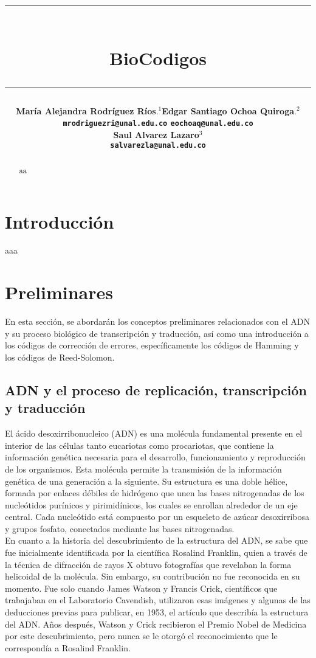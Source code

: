 \documentclass[12pt]{article}
\title{\vspace{-2cm}\par\noindent\rule{16cm}{1pt}\large
\\\bfseries BioCodigos
\vspace{-0.34cm}\par\noindent\hspace{0.15cm}\rule{16cm}{1pt}
\vspace{-0.6cm}
}
\author{\small \bfseries María Alejandra Rodríguez Ríos$.^1$\quad \quad\small Edgar Santiago Ochoa Quiroga$.^{2}$\\ \small \quad \texttt{mrodriguezri@unal.edu.co} \quad \quad \quad \quad \quad \quad \texttt{eochoaq@unal.edu.co}\quad\quad \quad\\ \small \bfseries Saul Alvarez Lazaro$^{3}$\\
\small \texttt{salvarezla@unal.edu.co}
}
\begin{document}
\maketitle
\begin{abstract}
aa
\end{abstract}

\section{Introducción}

aaa



\section{Preliminares}
En esta sección, se abordarán los conceptos preliminares relacionados con el ADN y su proceso biológico de transcripción y traducción, así como una introducción a los códigos de corrección de errores, específicamente los códigos de Hamming y los códigos de Reed-Solomon.
\subsection{ADN y el proceso de replicación, transcripción y traducción}

El ácido desoxirribonucleico (ADN) es una molécula fundamental presente en el interior de las células tanto eucariotas como procariotas, que contiene la información genética necesaria para el desarrollo, funcionamiento y reproducción de los organismos. Esta molécula permite la transmisión de la información genética de una generación a la siguiente. Su estructura es una doble hélice, formada por enlaces débiles de hidrógeno que unen las bases nitrogenadas de los nucleótidos purínicos y pirimidínicos, los cuales se enrollan alrededor de un eje central. Cada nucleótido está compuesto por un esqueleto de azúcar desoxirribosa y grupos fosfato, conectados mediante las bases nitrogenadas.\\

En cuanto a la historia del descubrimiento de la estructura del ADN, se sabe que fue inicialmente identificada por la científica Rosalind Franklin, quien a través de la técnica de difracción de rayos X obtuvo fotografías que revelaban la forma helicoidal de la molécula. Sin embargo, su contribución no fue reconocida en su momento. Fue solo cuando James Watson y Francis Crick, científicos que trabajaban en el Laboratorio Cavendish, utilizaron esas imágenes y algunas de las deducciones previas para publicar, en 1953, el artículo que describía la estructura del ADN. Años después, Watson y Crick recibieron el Premio Nobel de Medicina por este descubrimiento, pero nunca se le otorgó el reconocimiento que le correspondía a Rosalind Franklin.\\
\end{document}
